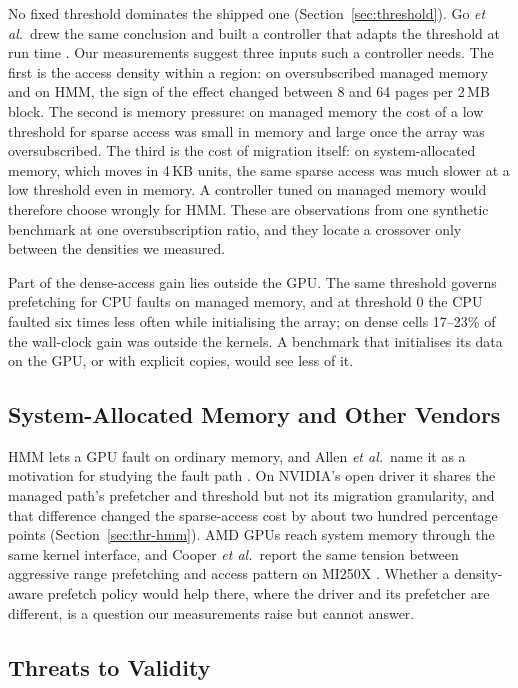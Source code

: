 No fixed threshold dominates the shipped one (Section~\ref{sec:threshold}). Go
\emph{et al.}\ drew the same conclusion and built a controller that adapts the
threshold at run time \cite{go2023earlyadaptor}. Our measurements suggest three
inputs such a controller needs. The first is the access density within a
region: on oversubscribed managed memory and on HMM, the sign of the effect changed
between 8 and 64 pages per 2\,MB block. The second is memory pressure: on managed memory
the cost of a low threshold for sparse access was small in memory and large
once the array was oversubscribed. The third is the cost of migration itself:
on system-allocated memory, which moves in 4\,KB units, the same sparse access
was much slower at a low threshold even in memory. A controller tuned on
managed memory would therefore choose wrongly for HMM. These are observations
from one synthetic benchmark at one oversubscription ratio, and they locate a
crossover only between the densities we measured.

Part of the dense-access gain lies outside the GPU. The same threshold governs
prefetching for CPU faults on managed memory, and at threshold 0 the CPU faulted
six times less often while initialising the array; on dense cells 17--23\% of
the wall-clock gain was outside the kernels. A benchmark that initialises its
data on the GPU, or with explicit copies, would see less of it.

\subsection{System-Allocated Memory and Other Vendors}

HMM lets a GPU fault on ordinary memory, and Allen \emph{et al.}\ name it as a
motivation for studying the fault path \cite{allen2024finegrain}. On NVIDIA's
open driver it shares the managed path's prefetcher and threshold but not its
migration granularity, and that difference changed the sparse-access cost by
about two hundred percentage points (Section~\ref{sec:thr-hmm}). AMD GPUs reach system
memory through the same kernel interface, and Cooper \emph{et al.}\ report the
same tension between aggressive range prefetching and access pattern on
MI250X \cite{cooper2024svm}. Whether a density-aware prefetch policy would help
there, where the driver and its prefetcher are different, is a question our
measurements raise but cannot answer.

\subsection{Threats to Validity}

